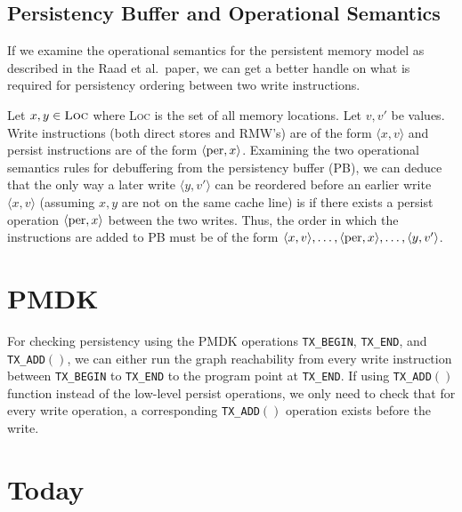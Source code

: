 \documentclass[11pt]{article}
\begin{document}
\subsection{Persistency Buffer and Operational Semantics}
If we examine the operational semantics for the persistent memory model as described in the Raad et al.\ paper, we can get a better handle on what is required for persistency ordering between two write instructions. 

Let $x,y \in \textsc{Loc}$ where \textsc{Loc} is the set of all memory locations. Let $v,v'$ be values. Write instructions (both direct stores and RMW's) are of the form $\langle x, v \rangle$ and persist instructions are of the form $\langle \textnormal{per}, x \rangle$. Examining the two operational semantics rules for debuffering from the persistency buffer (PB), we can deduce that the only way a later write $\langle y, v' \rangle$ can be reordered before an earlier write $\langle x,v \rangle$ (assuming $x,y$ are not on the same cache line) is if there exists a persist operation $\langle \textnormal{per}, x \rangle$ between the two writes. Thus, the order in which the instructions are added to PB must be of the form $\langle x, v \rangle, \ldots, \langle \textnormal{per}, x \rangle, \ldots, \langle y,v' \rangle$. 


\section{PMDK}
For checking persistency using the PMDK operations \texttt{TX_BEGIN}, \texttt{TX_END}, and \texttt{TX_ADD}$()$, we can either run the graph reachability from every write instruction between \texttt{TX_BEGIN} to \texttt{TX_END} to the program point at \texttt{TX_END}. If using \texttt{TX_ADD}$()$ function instead of the low-level persist operations, we only need to check that for every write operation, a corresponding \texttt{TX_ADD}$()$ operation exists before the write.


\section{Today}
\end{document}

